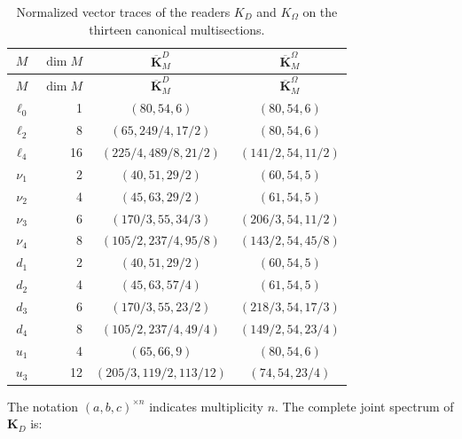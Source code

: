 \begin{longtable}{@{}c r c c@{}}
\caption{Normalized vector traces of the readers \(K_D\) and
\(K_\Omega\) on the thirteen canonical multisections.}
\label{tab:trazas-multisecciones-two-way-rev11}\\
\toprule
\(M\)&\(\dim M\)&\(\overline{\mathbf K}_M^D\)&\(\overline{\mathbf K}_M^\Omega\)\\
\midrule
\endfirsthead
\toprule
\(M\)&\(\dim M\)&\(\overline{\mathbf K}_M^D\)&\(\overline{\mathbf K}_M^\Omega\)\\
\midrule
\endhead
\(\ell_0\)&1&\((80,54,6)\)&\((80,54,6)\)\\
\(\ell_2\)&8&\((65,249/4,17/2)\)&\((80,54,6)\)\\
\(\ell_4\)&16&\((225/4,489/8,21/2)\)&\((141/2,54,11/2)\)\\
\(\nu_1\)&2&\((40,51,29/2)\)&\((60,54,5)\)\\
\(\nu_2\)&4&\((45,63,29/2)\)&\((61,54,5)\)\\
\(\nu_3\)&6&\((170/3,55,34/3)\)&\((206/3,54,11/2)\)\\
\(\nu_4\)&8&\((105/2,237/4,95/8)\)&\((143/2,54,45/8)\)\\
\(d_1\)&2&\((40,51,29/2)\)&\((60,54,5)\)\\
\(d_2\)&4&\((45,63,57/4)\)&\((61,54,5)\)\\
\(d_3\)&6&\((170/3,55,23/2)\)&\((218/3,54,17/3)\)\\
\(d_4\)&8&\((105/2,237/4,49/4)\)&\((149/2,54,23/4)\)\\
\(u_1\)&4&\((65,66,9)\)&\((80,54,6)\)\\
\(u_3\)&12&\((205/3,119/2,113/12)\)&\((74,54,23/4)\)\\
\bottomrule
\end{longtable}

The notation \((a,b,c)^{\times n}\) indicates multiplicity \(n\). The complete
joint spectrum of \(\mathbf K_D\) is:

